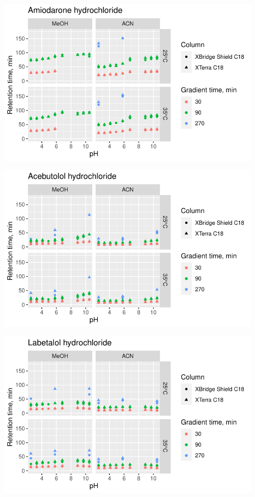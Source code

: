 \documentclass[
  letterpaper,
  DIV=11,
  numbers=noendperiod]{scrreprt}
\begin{document}
\includegraphics{index_files/figure-pdf/unnamed-chunk-4-93.pdf}

\includegraphics{index_files/figure-pdf/unnamed-chunk-4-94.pdf}

\includegraphics{index_files/figure-pdf/unnamed-chunk-4-95.pdf}
\end{document}
